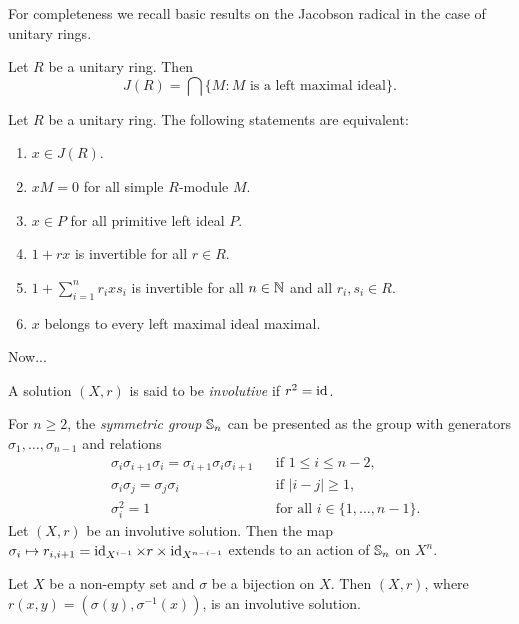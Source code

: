 For completeness we recall basic results on the Jacobson radical in the case
of unitary rings. 

\begin{exercise}
	Let $R$ be a unitary ring. Then  
	\[
	J(R)=\bigcap\{M:\text{$M$ is a left maximal ideal}\}.
	\]
\end{exercise}

\begin{exercise}
	Let $R$ be a unitary ring. The
	following statements are equivalent: 
	\begin{enumerate}
		\item $x\in J(R)$.
		\item $xM=0$ for all simple $R$-module $M$.
		\item $x\in P$ for all primitive left ideal $P$.
		\item $1+rx$ is invertible for all $r\in R$.
		\item $1+\sum_{i=1}^n r_ixs_i$ is invertible for all $n\in\mathbb{N}$ and all $r_i,s_i\in R$.
		\item $x$ belongs to every left maximal ideal maximal. 
	\end{enumerate}
\end{exercise}

Now...

\begin{definition}
A solution $(X,r)$ is said to be \emph{involutive} if $r^2=\operatorname{id}$. 
\end{definition}

For $n\geq2$, the \emph{symmetric group} $\mathbb{S}_n$ can be presented 
as the group with generators $\sigma_1,\dots,\sigma_{n-1}$ and relations
\begin{align*}
    &\sigma_i\sigma_{i+1}\sigma_i=\sigma_{i+1}\sigma_i\sigma_{i+1} && \text{if }1\leq i\leq n-2,\\
    &\sigma_i\sigma_j=\sigma_j\sigma_i && \text{if }|i-j|\geq 1,\\
    &\sigma_i^2=1 && \text{for all $i\in\{1,\dots,n-1\}$}.
\end{align*}
Let $(X,r)$ be an involutive solution. 
Then the map $\sigma_i\mapsto r_{i,i+1}=\operatorname{id}_{X^{i-1}}\times r\times\operatorname{id}_{X^{n-i-1}}$ extends 
to an action of $\mathbb{S}_n$ on $X^n$.

\begin{example}
Let $X$ be a non-empty set and $\sigma$ be a bijection on $X$. Then 
$(X,r)$, where $r(x,y)=(\sigma(y),\sigma^{-1}(x))$, is an involutive solution. 
\end{example}

